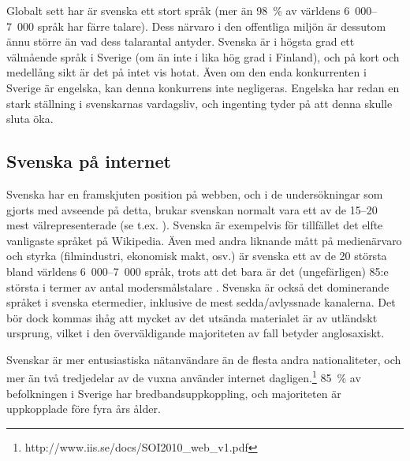 \begin{multicols}{2}
Globalt sett har är svenska ett stort språk (mer än 98~\% av världens
6~000--7~000 språk har färre talare). Dess närvaro i den offentliga
miljön är dessutom ännu större än vad dess talarantal antyder. Svenska
är i högsta grad ett välmående språk i Sverige (om än inte i lika hög
grad i Finland), och på kort och medellång sikt är det på intet vis
hotat. Även om den enda konkurrenten i Sverige är engelska, kan denna
konkurrens inte negligeras. Engelska har redan en stark ställning i
svenskarnas vardagsliv, och ingenting tyder på att denna skulle sluta
öka.

\subsection{Svenska på internet}

Svenska har en framskjuten position på webben, och i de undersökningar
som gjorts med avseende på detta, brukar svenskan normalt vara ett av
de 15--20 mest välrepresenterade (se
t.ex. \cite[63]{parkvall2006}). Svenska är exempelvis för tillfället
det elfte vanligaste språket på Wikipedia. Även med andra liknande
mått på medienärvaro och styrka (filmindustri, ekonomisk makt, osv.)
är svenska ett av de 20 största bland världens 6~000--7~000 språk,
trots att det bara är det (ungefärligen) 85:e största i termer av
antal modersmålstalare \cite[55--64]{parkvall2006}. Svenska är också
det dominerande språket i svenska etermedier, inklusive de mest
sedda/avlyssnade kanalerna. Det bör dock kommas ihåg att mycket av det
utsända materialet är av utländskt ursprung, vilket i den
överväldigande majoriteten av fall betyder anglosaxiskt.


Svenskar är mer entusiastiska nätanvändare än de flesta andra
nationaliteter, och mer än två tredjedelar av de vuxna använder
internet dagligen.\footnote{http://www.iis.se/docs/SOI2010\_web\_v1.pdf
} 85~\% av befolkningen i Sverige har bredbandsuppkoppling, och
majoriteten är uppkopplade före fyra års ålder.

\end{multicols}

\clearpage



